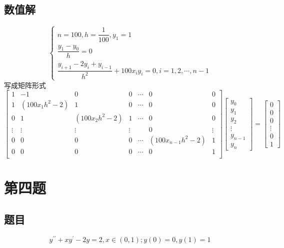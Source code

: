\documentclass{ctexart}
\numberwithin{equation}{section}
\begin{document}
\subsection{数值解}
\begin{equation}
    \left\{
        \begin{array}{l}
            n = 100,h=\dfrac{1}{100},y_1=1\\
            \dfrac{y_1-y_0}{h}=0\\
            \dfrac{y_{i+1}-2y_{i}+y_{i-1}}{h^2}+100x_iy_i=0,i = 1,2,\cdots,n-1
        \end{array}
            \right.
\end{equation}
写成矩阵形式
\begin{equation}
    \begin{bmatrix}
        1 & -1 & 0 & 0 & \cdots & 0 & 0\\
        1 & (100x_1h^2-2) & 1 & 0 & \cdots & 0 & 0\\
        0 & 1 & (100x_2h^2-2) & 1 & \cdots & 0 & 0\\
        \vdots & \vdots & \vdots & \vdots &  & 0 & \vdots\\
        0 & 0 & 0 & 0 & \cdots & (100x_{n-1}h^2-2) & 1\\
        0 & 0 & 0 & 0 & \cdots & 0 & 1\\
    \end{bmatrix}
    \begin{bmatrix}
        y_0\\
        y_1\\
        y_2\\
        \vdots\\
        y_{n-1}\\
        y_n
    \end{bmatrix}
    =
    \begin{bmatrix}
        0\\
        0\\
        0\\
        \vdots\\
        0\\
        1
    \end{bmatrix}
\end{equation}
\section{第四题}
\subsection{题目}
\[y^{\prime \prime}+x y^{\prime}-2 y=2, x \in(0,1) ; y(0)=0, y(1)=1\] 
\end{document}
